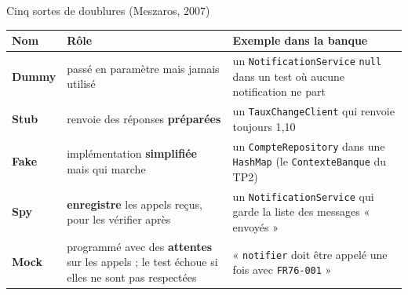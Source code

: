 \documentclass[aspectratio=169,10pt]{beamer}
\begin{document}
\begin{frame}{Cinq sortes de doublures (Meszaros, 2007)}
  \footnotesize
  \begin{datacard}
    \begin{tabular}{@{}p{1.2cm}p{4.9cm}p{6.0cm}@{}}
      \toprule
      \textbf{Nom} & \textbf{Rôle} & \textbf{Exemple dans la banque} \\
      \midrule
      \textbf{\color{qaaccent}Dummy} & passé en paramètre mais jamais utilisé & un \texttt{NotificationService} \texttt{null} dans un test où aucune notification ne part \\[1mm]
      \textbf{\color{qaaccent}Stub} & renvoie des réponses \textbf{préparées} & un \texttt{TauxChangeClient} qui renvoie toujours 1,10 \\[1mm]
      \textbf{\color{qaaccent}Fake} & implémentation \textbf{simplifiée} mais qui marche & un \texttt{CompteRepository} dans une \texttt{HashMap} (le \texttt{ContexteBanque} du TP2) \\[1mm]
      \textbf{\color{qaaccent}Spy} & \textbf{enregistre} les appels reçus, pour les vérifier après & un \texttt{NotificationService} qui garde la liste des messages « envoyés » \\[1mm]
      \textbf{\color{qaaccent}Mock} & programmé avec des \textbf{attentes} sur les appels ; le test échoue si elles ne sont pas respectées & « \texttt{notifier} doit être appelé une fois avec \texttt{FR76-001} » \\
      \bottomrule
    \end{tabular}
  \end{datacard}
  \vspace{1mm}
\end{frame}
\end{document}
